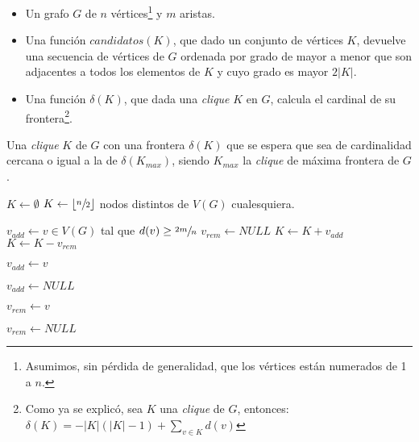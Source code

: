 \bigskip

\begin{pseudocodigo}
    \Require\Statex
        \begin{itemize}
            \item Un grafo $G$ de $n$ v\'ertices\footnote{Asumimos, sin p\'erdida 
                de generalidad, que los v\'ertices est\'an numerados de 1 a $n$.}
                y $m$ aristas.

            \item Una funci\'on $candidatos(K)$, que dado un conjunto de v\'ertices
                $K$, devuelve una secuencia de v\'ertices de $G$ ordenada por grado
                de mayor a menor que son adjacentes a todos los elementos de $K$ y
                cuyo grado es mayor $2|K|$.

            \item Una funci\'on $\delta(K)$, que dada una \emph{clique} $K$ en $G$, calcula
                el cardinal de su frontera\footnote{Como ya se explic\'o, sea $K$ una
                \emph{clique} de $G$, entonces: $\delta(K) = - |K|(|K|-1) +
                \displaystyle\sum_{v \in K} d(v)$}.
        \end{itemize}

    \Statex
    \Ensure Una \emph{clique} $K$ de $G$ con una frontera $\delta(K)$ que se
        espera que sea de cardinalidad cercana o igual a la de $\delta(K_{max})$,
        siendo $K_{max}$ la \emph{clique} de m\'axima frontera de $G$.

    \Statex
    \State $K \gets \emptyset$
        \State $K \gets \lfloor\sfrac{n}{2}\rfloor$ nodos distintos de $V(G)$ cualesquiera.
        \Statex

    \Else
        \State $v_{add} \gets v \in V(G)$ tal que $d(v) \geq \sfrac{2m}{n}$
        \State $v_{rem} \gets NULL$
                \State $K \gets K+v_{add}$
            \Else
                \State $K \gets K-v_{rem}$
            \EndIf

            \Statex
                \State $v_{add} \gets v$

            \Else
                \State $v_{add} \gets NULL$
            \EndIf

            \Statex
                \State $v_{rem} \gets v$

            \Else
                \State $v_{rem} \gets NULL$
            \EndIf
        \EndWhile
    \EndIf

    \State {}
\end{pseudocodigo}

